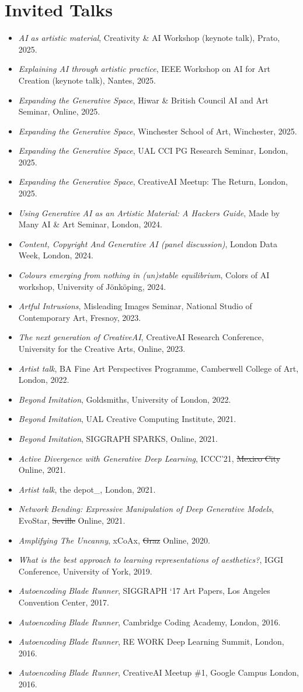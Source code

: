 \documentclass[letterpaper,11pt]{article}
\newcommand{\resumeItem}[2]{
  \item\small{
    \textbf{#1}{ #2 \vspace{-2pt}}
  }
}
\newcommand{\resumeSubItem}[2]{\resumeItem{#1}{#2}\vspace{-4pt}}
\newcommand{\resumeSubHeadingListStart}{\begin{itemize}[leftmargin=*]}
\newcommand{\resumeSubHeadingListEnd}{\end{itemize}}
\begin{document}
\section{Invited Talks}
 \resumeSubHeadingListStart
 \resumeSubItem{}{\textit{AI as artistic material}, Creativity \& AI Workshop (keynote talk), Prato, 2025.}
 \resumeSubItem{}{\textit{Explaining AI through artistic practice}, IEEE Workshop on AI for Art Creation (keynote talk), Nantes, 2025.}
 \resumeSubItem{}{\textit{Expanding the Generative Space}, Hiwar \& British Council AI and Art Seminar, Online, 2025.}
 \resumeSubItem{}{\textit{Expanding the Generative Space}, Winchester School of Art, Winchester, 2025.}
 \resumeSubItem{}{\textit{Expanding the Generative Space}, UAL CCI PG Research Seminar, London, 2025.}
 \resumeSubItem{}{\textit{Expanding the Generative Space}, CreativeAI Meetup: The Return, London, 2025.}
 \resumeSubItem{}{\textit{Using Generative AI as an Artistic Material: A Hackers Guide}, Made by Many AI \& Art Seminar, London, 2024.}
 \resumeSubItem{}{\textit{Content, Copyright And Generative AI (panel discussion)}, London Data Week, London, 2024.}
\resumeSubItem{}{\textit{Colours emerging from nothing in \textit{(un)stable equilibrium}}, Colors of AI workshop, University of Jönköping, 2024.}
 \resumeSubItem{}{\textit{Artful Intrusions}, Misleading Images Seminar, National Studio of Contemporary Art, Fresnoy, 2023.}
  \resumeSubItem{}{\textit{The next generation of CreativeAI}, CreativeAI Research Conference, University for the Creative Arts, Online, 2023.}
  \resumeSubItem{}{\textit{Artist talk}, BA Fine Art Perspectives Programme, Camberwell College of Art, London, 2022.}
  \resumeSubItem{}{\textit{Beyond Imitation}, Goldsmiths, University of London, 2022.}
  \resumeSubItem{}{\textit{Beyond Imitation}, UAL Creative Computing Institute, 2021.}
  \resumeSubItem{}{\textit{Beyond Imitation}, SIGGRAPH SPARKS, Online, 2021.}
  \resumeSubItem{}{\textit{Active Divergence with Generative Deep Learning}, ICCC'21, \sout{Mexico City} Online, 2021.}
  \resumeSubItem{}{\textit{Artist talk}, the depot\_, London, 2021.}
  \resumeSubItem{}{\textit{Network Bending: Expressive Manipulation of Deep Generative Models}, EvoStar, \sout{Seville} Online, 2021.}
  \resumeSubItem{}{\textit{Amplifying The Uncanny}, xCoAx, \sout{Graz} Online, 2020.}
  \resumeSubItem{}{\textit{What is the best approach to learning representations of aesthetics?}, IGGI Conference, University of York, 2019.}
  \resumeSubItem{}{\textit{Autoencoding Blade Runner}, SIGGRAPH `17 Art Papers, Los Angeles Convention Center, 2017.}
  \resumeSubItem{}{\textit{Autoencoding Blade Runner}, Cambridge Coding Academy, London, 2016.}
  \resumeSubItem{}{\textit{Autoencoding Blade Runner}, RE WORK Deep Learning Summit, London, 2016.}  
  \resumeSubItem{}{\textit{Autoencoding Blade Runner},  CreativeAI Meetup \#1, Google Campus London, 2016.}  
 \resumeSubHeadingListEnd
 
\end{document}
